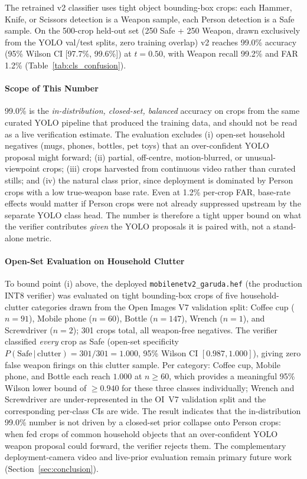 \documentclass{ieeeaccess}
\begin{document}
The retrained v2 classifier uses tight object bounding-box crops: each Hammer, Knife, or Scissors detection is a Weapon sample, each Person detection is a Safe sample. On the 500-crop held-out set (250 Safe + 250 Weapon, drawn exclusively from the YOLO val/test splits, zero training overlap) v2 reaches 99.0\% accuracy (95\% Wilson CI [97.7\%, 99.6\%]) at $t{=}0.50$, with Weapon recall 99.2\% and FAR 1.2\% (Table~\ref{tab:cls_confusion}).

\paragraph*{Scope of This Number}
99.0\% is the \emph{in-distribution, closed-set, balanced} accuracy on crops from the same curated YOLO pipeline that produced the training data, and should not be read as a live verification estimate. The evaluation excludes (i) open-set household negatives (mugs, phones, bottles, pet toys) that an over-confident YOLO proposal might forward; (ii) partial, off-centre, motion-blurred, or unusual-viewpoint crops; (iii) crops harvested from continuous video rather than curated stills; and (iv) the natural class prior, since deployment is dominated by Person crops with a low true-weapon base rate. Even at 1.2\% per-crop FAR, base-rate effects would matter if Person crops were not already suppressed upstream by the separate YOLO class head. The number is therefore a tight upper bound on what the verifier contributes \emph{given} the YOLO proposals it is paired with, not a stand-alone metric.

\paragraph*{Open-Set Evaluation on Household Clutter}
To bound point (i) above, the deployed \texttt{mobilenetv2\_garuda.hef} (the production INT8 verifier) was evaluated on tight bounding-box crops of five household-clutter categories drawn from the Open Images V7 validation split: Coffee cup ($n{=}91$), Mobile phone ($n{=}60$), Bottle ($n{=}147$), Wrench ($n{=}1$), and Screwdriver ($n{=}2$); 301 crops total, all weapon-free negatives. The verifier classified \emph{every} crop as Safe (open-set specificity $P(\text{Safe}\,|\,\text{clutter}) = 301/301 = 1.000$, 95\% Wilson CI $[0.987, 1.000]$), giving zero false weapon firings on this clutter sample. Per category: Coffee cup, Mobile phone, and Bottle each reach $1.000$ at $n \geq 60$, which provides a meaningful 95\% Wilson lower bound of $\geq 0.940$ for these three classes individually; Wrench and Screwdriver are under-represented in the OI~V7 validation split and the corresponding per-class CIs are wide. The result indicates that the in-distribution 99.0\% number is not driven by a closed-set prior collapse onto Person crops: when fed crops of common household objects that an over-confident YOLO weapon proposal could forward, the verifier rejects them. The complementary deployment-camera video and live-prior evaluation remain primary future work (Section~\ref{sec:conclusion}).
\end{document}
